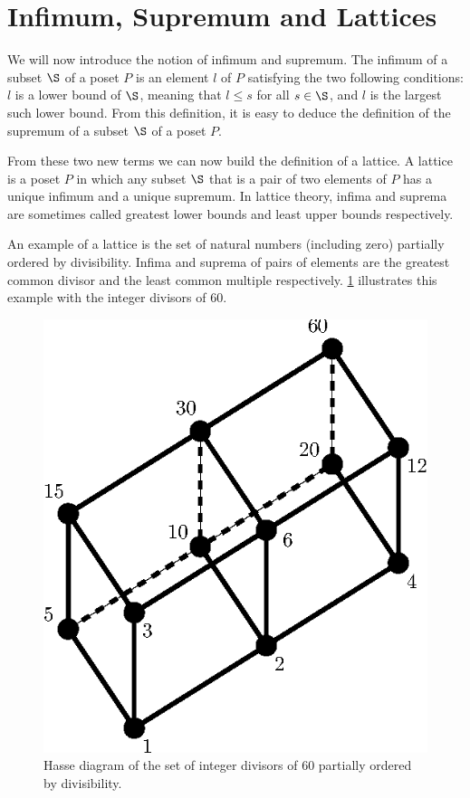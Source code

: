 \section{Infimum, Supremum and Lattices}
\label{tree:poset:lattices}

We will now introduce the notion of infimum and supremum. The infimum of a
subset \(\S\) of a poset \(P\) is an element \(l\) of \(P\) satisfying the two
following conditions: \(l\) is a lower bound of \(\S\), meaning that \(l \le
s\) for all \(s \in \S\), and \(l\) is the largest such lower bound. From this
definition, it is easy to deduce the definition of the supremum of a subset
\(\S\) of a poset \(P\).

From these two new terms we can now build the definition of a lattice. A
lattice is a poset \(P\) in which any subset \(\S\) that is a pair of two
elements of \(P\) has a unique infimum and a unique supremum. In lattice
theory, infima and suprema are sometimes called greatest lower bounds and least
upper bounds respectively.

An example of a lattice is the set of natural numbers (including zero)
partially ordered by divisibility. Infima and suprema of pairs of elements are
the greatest common divisor and the least common multiple respectively.
\ref{fig:poset:lattice:60div} illustrates this example with the integer divisors of
\(60\).

\begin{figure}
\center
\includegraphics[height=0.2\textheight]{fig/poset/lattice/60div}
\caption{Hasse diagram of the set of integer divisors of \(60\) partially ordered by
divisibility.}\label{fig:poset:lattice:60div}
\end{figure}

